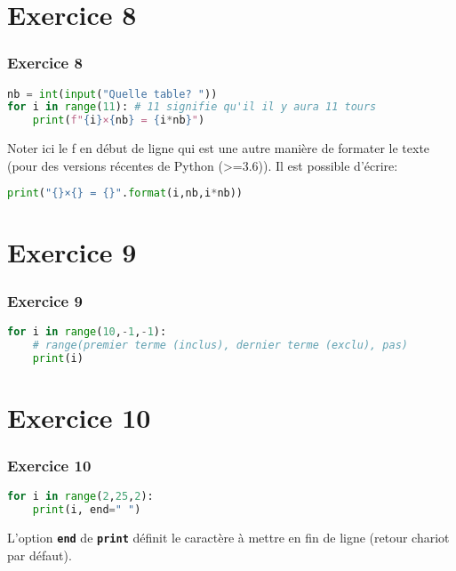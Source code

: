 \documentclass[svgnames,11pt]{beamer}
\begin{document}
\section{Exercice 8}
\begin{frame}[fragile]
    \frametitle{Exercice 8}

\begin{center}
\begin{lstlisting}[language=Python , basicstyle=\ttfamily\small, xleftmargin=1em, xrightmargin=1em]
nb = int(input("Quelle table? "))
for i in range(11): # 11 signifie qu'il il y aura 11 tours
    print(f"{i}×{nb} = {i*nb}")
\end{lstlisting}
\label{CODE}
\end{center} 
\begin{aretenir}[Remarque]
    Noter ici le f en début de ligne qui est une autre manière de formater le texte (pour des versions
    récentes de Python (>=3.6)). Il est possible d'écrire:
\begin{lstlisting}[language=Python , basicstyle=\ttfamily\small, xleftmargin=2em, xrightmargin=2em]
print("{}×{} = {}".format(i,nb,i*nb))
\end{lstlisting}
\end{aretenir}
\end{frame}
\section{Exercice 9}
\begin{frame}[fragile]
    \frametitle{Exercice 9}

\begin{center}
\begin{lstlisting}[language=Python , basicstyle=\ttfamily\small, xleftmargin=2em, xrightmargin=2em]
for i in range(10,-1,-1):
    # range(premier terme (inclus), dernier terme (exclu), pas)
    print(i)
\end{lstlisting}
\label{CODE}
\end{center}

\end{frame}
\section{Exercice 10}
\begin{frame}[fragile]
    \frametitle{Exercice 10}

\begin{center}
\begin{lstlisting}[language=Python , basicstyle=\ttfamily\small, xleftmargin=2em, xrightmargin=2em]
for i in range(2,25,2):
    print(i, end=" ")
\end{lstlisting}
\label{CODE}
\end{center}
\begin{aretenir}[Remarque]
    L'option \texttt{\textbf{end}} de \texttt{\textbf{print}} définit le caractère à mettre en fin de ligne (retour chariot par défaut).
\end{aretenir}
\end{frame}
\end{document}
